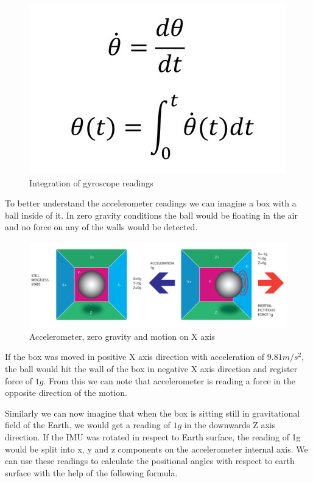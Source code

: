 \begin{figure}[H]
    \begin{center}
    \includegraphics[scale = 0.4]{pictures/IMU/gyro_calculation.png}
    \end{center}
    \caption{Integration of gyroscope readings}
    \label{fig:my_label}
\end{figure}


To better understand the accelerometer readings we can imagine a box with a ball inside of it. In zero gravity conditions the ball would be floating in the air and no force on any of the walls would be detected.


\begin{figure}[H]
    \begin{center}
    \includegraphics[scale = 0.5]{pictures/IMU/Accel_0grav.png}
    \end{center}
    \caption{Accelerometer, zero gravity and motion on X axis }
    \label{fig:my_label}
\end{figure}

If the box was moved in positive X axis direction with acceleration of $9.81 m/s^2$, the ball would hit the wall of the box in negative X axis direction and register force of $1g$. From this we can note that accelerometer is reading a force in the opposite direction of the motion. 

Similarly we can now imagine that when the box is sitting still in gravitational field of the Earth, we would get a reading of $1g$ in the downwards Z axis direction. If the IMU was rotated in respect to Earth surface, the reading of 1g would be split into x, y and z components on the accelerometer internal axis. We can use these readings to calculate the positional angles with respect to earth surface with the help of the following formula.

